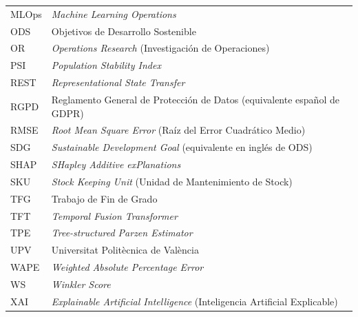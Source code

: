 \begin{tabular}{@{}p{3cm}p{10cm}@{}}
MLOps     & \textit{Machine Learning Operations} \\
ODS       & Objetivos de Desarrollo Sostenible \\
OR        & \textit{Operations Research} (Investigación de Operaciones) \\
PSI       & \textit{Population Stability Index} \\
REST      & \textit{Representational State Transfer} \\
RGPD      & Reglamento General de Protección de Datos (equivalente español de GDPR) \\
RMSE      & \textit{Root Mean Square Error} (Raíz del Error Cuadrático Medio) \\
SDG       & \textit{Sustainable Development Goal} (equivalente en inglés de ODS) \\
SHAP      & \textit{SHapley Additive exPlanations} \\
SKU       & \textit{Stock Keeping Unit} (Unidad de Mantenimiento de Stock) \\
TFG       & Trabajo de Fin de Grado \\
TFT       & \textit{Temporal Fusion Transformer} \\
TPE       & \textit{Tree-structured Parzen Estimator} \\
UPV       & Universitat Politècnica de València \\
WAPE      & \textit{Weighted Absolute Percentage Error} \\
WS        & \textit{Winkler Score} \\
XAI       & \textit{Explainable Artificial Intelligence} (Inteligencia Artificial Explicable) \\
\end{tabular}
